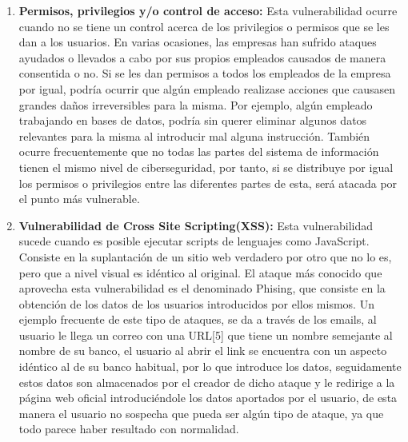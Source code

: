 \begin{enumerate}
\item {\bfseries Permisos, privilegios y/o control de acceso:}
Esta vulnerabilidad ocurre cuando no se tiene un control acerca de los privilegios o permisos que se les dan a los usuarios.
En varias ocasiones, las empresas han sufrido ataques ayudados o llevados a cabo por sus propios empleados causados de manera consentida o no.
Si se les dan permisos a todos los empleados de la empresa por igual, podría ocurrir que algún empleado realizase acciones que causasen grandes daños irreversibles para la misma.
Por ejemplo, algún empleado trabajando en bases de datos, podría sin querer eliminar algunos datos relevantes para la misma al introducir mal alguna instrucción.
También ocurre frecuentemente que no todas las partes del sistema de información tienen el mismo nivel de ciberseguridad, por tanto, si se distribuye por igual los permisos o privilegios entre las diferentes partes de esta, será atacada por el punto más vulnerable.

\item {\bfseries Vulnerabilidad de Cross Site Scripting(XSS): }
Esta vulnerabilidad sucede cuando es posible ejecutar scripts de lenguajes como JavaScript.
Consiste en la suplantación de un sitio web verdadero por otro que no lo es, pero que a nivel visual es idéntico al original.
El ataque más conocido que aprovecha esta vulnerabilidad es el denominado Phising, que consiste en la obtención de los datos de los usuarios introducidos por ellos mismos.
Un ejemplo frecuente de este tipo de ataques, se da a través de los emails, al usuario le llega un correo con una URL[5] que tiene un nombre semejante al nombre de su banco, el usuario al abrir el link se encuentra con un aspecto idéntico al de su banco habitual, por lo que introduce los datos, seguidamente estos datos son almacenados por el creador de dicho ataque y le redirige a la página web oficial introduciéndole los datos aportados por el usuario, de esta manera el usuario no sospecha que pueda ser algún tipo de ataque, ya que todo parece haber resultado con normalidad.

\end{enumerate}

